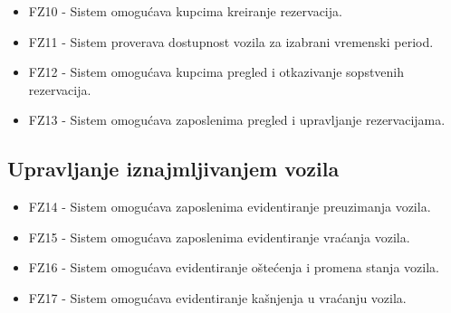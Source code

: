 \begin{itemize}
    \item FZ10 - Sistem omogućava kupcima kreiranje rezervacija.
    \item FZ11 - Sistem proverava dostupnost vozila za izabrani vremenski period.
    \item FZ12 - Sistem omogućava kupcima pregled i otkazivanje sopstvenih rezervacija.
    \item FZ13 - Sistem omogućava zaposlenima pregled i upravljanje rezervacijama.
\end{itemize}

\subsection{Upravljanje iznajmljivanjem vozila}

\begin{itemize}
    \item FZ14 - Sistem omogućava zaposlenima evidentiranje preuzimanja vozila.
    \item FZ15 - Sistem omogućava zaposlenima evidentiranje vraćanja vozila.
    \item FZ16 - Sistem omogućava evidentiranje oštećenja i promena stanja vozila.
    \item FZ17 - Sistem omogućava evidentiranje kašnjenja u vraćanju vozila.
\end{itemize}
